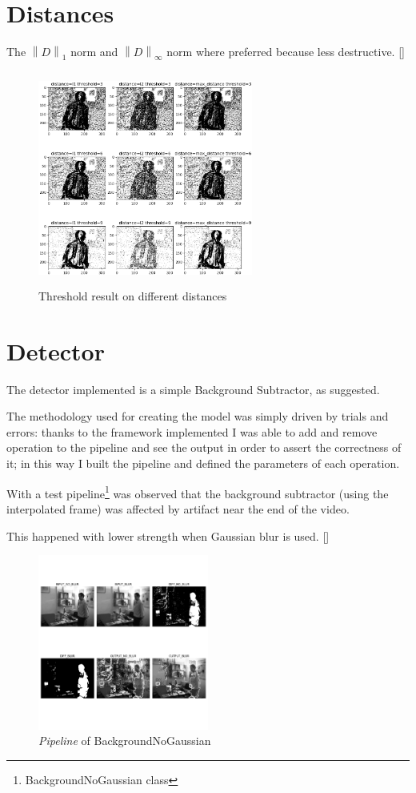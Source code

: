 \documentclass{article}
\newcommand{\CREF}[1]{[\hyperref[#1]{\Cref{#1}}]}
\newcommand{\norm}[1]{\left\lVert#1\right\rVert}
\begin{document}
\section{Distances}
The $\norm{D}_{1}$ norm and $\norm{D}_{\infty}$ norm where preferred because less destructive. \CREF{fig:thr}
\begin{figure}
    \centering
    \includegraphics[width=200pt,height=200pt]{thr_distances.png}
    \caption{Threshold result on different distances}
    \label{fig:thr}
\end{figure}

\section{Detector}
The detector implemented is a simple Background Subtractor, as suggested.

The methodology used for creating the model was simply driven by trials and errors: thanks to the framework implemented I was able to add and remove operation to the pipeline and see the output in order to assert the correctness of it; in this way I built the pipeline and defined the parameters of each operation.

With a test pipeline\footnote{BackgroundNoGaussian class} was observed that the background subtractor (using the interpolated frame) was affected by artifact near the end of the video.

This happened with lower strength when Gaussian blur is used. \CREF{fig:gaussian}
\begin{figure}[ht]
    \centering
    \includegraphics[width=0.5\textwidth,keepaspectratio]{background_no_gaussian.PNG}
    \caption{\textit{Pipeline} of BackgroundNoGaussian}
    \label{fig:gaussian}
\end{figure}
\end{document}
